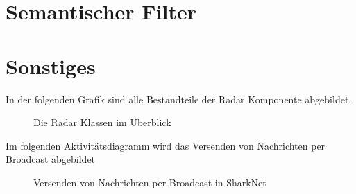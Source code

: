 \documentclass[german, 12pt]{book}
\begin{document}
\chapter{Semantischer Filter}


\chapter{Sonstiges}


\newpage

In der folgenden Grafik sind alle Bestandteile der Radar Komponente abgebildet.
\begin{figure}[H]
	\centering
	\hspace*{1cm}
	\caption{Die Radar Klassen im Überblick}
	\label{fig:radarAll}
\end{figure}

\newpage

Im folgenden Aktivitätsdiagramm wird das Versenden von Nachrichten per Broadcast abgebildet
\begin{figure}[H]
	\centering
	\hspace*{1cm}
	\caption{Versenden von Nachrichten per Broadcast in SharkNet}
	\label{fig:broadcastSend}
\end{figure}
\end{document}
